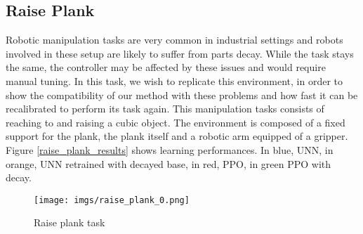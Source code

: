 \documentclass[letterpaper, 10 pt, conference]{ieeeconf}  %
\begin{document}



\subsection{Raise Plank} %
\label{ssub:raise_plank}

Robotic manipulation tasks are very common in industrial settings and robots involved in these setup are likely to suffer from parts decay. While the task stays the same, the controller may be affected by these issues and would require manual tuning. In this task, we wish to replicate this environment, in order to show the compatibility of our method with these problems and how fast it can be recalibrated to perform its task again. 
This manipulation tasks consists of reaching to and raising a cubic object. The environment is composed of a fixed support for the plank, the plank itself and a robotic arm equipped of a gripper. Figure \ref{raise_plank_results} shows learning performances. In blue, UNN, in orange, UNN retrained with decayed base, in red, PPO, in green PPO with decay.   



\begin{figure}
\centering
\texttt{[image: imgs/raise\_plank\_0.png]}
\caption{Raise plank task}
\label{raise_plank}
\end{figure}
\end{document}
